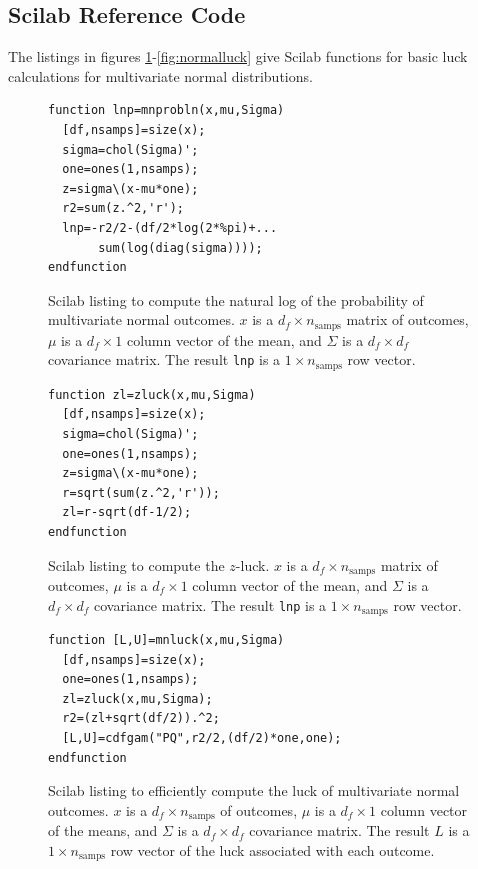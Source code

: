 \subsection{Scilab Reference Code}

The listings in figures \ref{fig:mnprobln}-\ref{fig:normalluck} give Scilab functions for basic luck calculations for multivariate normal distributions.

\begin{figure}
\caption{\label{fig:mnprobln}Scilab listing to compute the natural log of the probability of multivariate normal outcomes.  $x$ is a $d_f \times n_{\text{samps}}$ matrix of outcomes, $\mu$ is a $d_f \times 1$ column vector of the mean, and $\Sigma$ is a $d_f \times d_f$ covariance matrix.  The result {\tt lnp} is a $1 \times n_{\text{samps}}$ row vector.}
\lstset{language=Scilab}
\begin{lstlisting}
function lnp=mnprobln(x,mu,Sigma)
  [df,nsamps]=size(x);
  sigma=chol(Sigma)';
  one=ones(1,nsamps);  
  z=sigma\(x-mu*one);
  r2=sum(z.^2,'r');
  lnp=-r2/2-(df/2*log(2*%pi)+...
       sum(log(diag(sigma))));
endfunction
\end{lstlisting}
\end{figure}

\begin{figure}
\caption{\label{fig:zluck}Scilab listing to compute the $z$-luck.  $x$ is a $d_f \times n_{\text{samps}}$ matrix of outcomes, $\mu$ is a $d_f \times 1$ column vector of the mean, and $\Sigma$ is a $d_f \times d_f$ covariance matrix.  The result {\tt lnp} is a $1 \times n_{\text{samps}}$ row vector.}
\lstset{language=Scilab}
\begin{lstlisting}
function zl=zluck(x,mu,Sigma)
  [df,nsamps]=size(x);
  sigma=chol(Sigma)';
  one=ones(1,nsamps);
  z=sigma\(x-mu*one);
  r=sqrt(sum(z.^2,'r'));
  zl=r-sqrt(df-1/2);
endfunction
\end{lstlisting}
\end{figure}

\begin{figure}
\caption{\label{fig:mnluck}Scilab listing to efficiently compute the luck of multivariate normal outcomes.  $x$ is a $d_f \times n_{\text{samps}}$ of outcomes, $\mu$ is a $d_f \times 1$ column vector of the means, and $\Sigma$ is a $d_f \times d_f$ covariance matrix.  The result $L$ is a $1 \times n_{\text{samps}}$ row vector of the luck associated with each outcome.}
\lstset{language=Scilab}
\begin{lstlisting}
function [L,U]=mnluck(x,mu,Sigma)
  [df,nsamps]=size(x);
  one=ones(1,nsamps);
  zl=zluck(x,mu,Sigma);
  r2=(zl+sqrt(df/2)).^2;
  [L,U]=cdfgam("PQ",r2/2,(df/2)*one,one);
endfunction
\end{lstlisting}
\end{figure}

